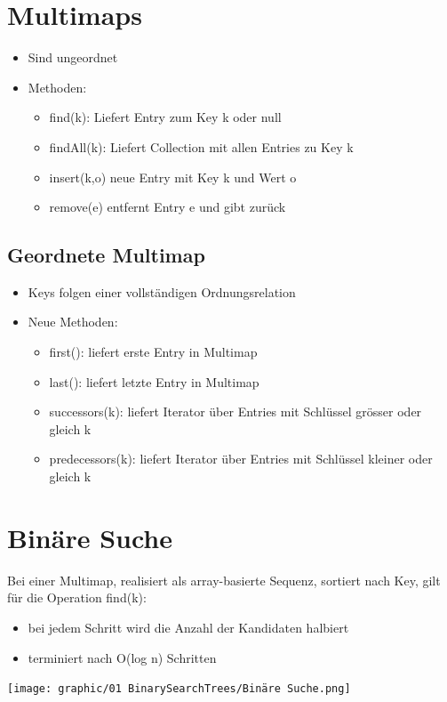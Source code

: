 \section{Multimaps}
\begin{itemize}
    \item Sind ungeordnet
    \item Methoden:
    \begin{itemize}
        \item find(k): Liefert Entry zum Key k oder null
        \item findAll(k): Liefert Collection mit allen Entries zu Key k
        \item insert(k,o) neue Entry mit Key k und Wert o
        \item remove(e) entfernt Entry e und gibt zurück
    \end{itemize}
\end{itemize}

\subsection{Geordnete Multimap}
\begin{itemize}
    \item Keys folgen einer vollständigen Ordnungsrelation
    \item Neue Methoden:
    \begin{itemize}
        \item first(): liefert erste Entry in Multimap
        \item last(): liefert letzte Entry in Multimap
        \item successors(k): liefert Iterator über Entries mit Schlüssel grösser oder gleich k
        \item predecessors(k): liefert Iterator über Entries mit Schlüssel kleiner oder gleich k
    \end{itemize}
\end{itemize}

\section{Binäre Suche}
Bei einer Multimap, realisiert als array-basierte Sequenz, sortiert nach Key, gilt für die Operation find(k):\\
\begin{itemize}
    \item bei jedem Schritt wird die Anzahl der Kandidaten halbiert
    \item terminiert nach O(log n) Schritten
\end{itemize}
\begin{center}
    \vspace{-4pt}
    \texttt{[image: graphic/01 BinarySearchTrees/Binäre Suche.png]}
    \vspace{-8pt}
\end{center}

